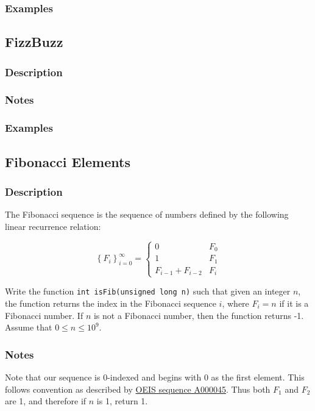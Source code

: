 \documentclass{article}
\begin{document}
\subsubsection{Examples}
\blindtext

\subsection{FizzBuzz}
\subsubsection{Description}
\blindtext

\subsubsection{Notes}
\blindtext

\subsubsection{Examples}
\blindtext

\subsection{Fibonacci Elements}
\subsubsection{Description}
The Fibonacci sequence is the sequence of numbers defined by the following linear recurrence relation:

\begin{equation}
  \left \{     F_i     \right \}_{i=0}^{\infty } = \begin{cases}
    0 & F_0\\
    1 & F_1 \\
    F_{i-1} + F_{i-2} & F_i
  \end{cases}
\end{equation}

Write the function \texttt{int isFib(unsigned long n)} such that given an integer $n$, the function returns the index in the Fibonacci sequence $i$, where $F_i = n$ if it is a Fibonacci number. 
If $n$ is not a Fibonacci number, then the function returns -1.
Assume that $ 0 \le n \le 10^9 $.

\subsubsection{Notes}
Note that our sequence is 0-indexed and begins with 0 as the first element. 
This follows convention as described by \href{https://oeis.org/A000045}{OEIS sequence A000045}.
Thus both $F_1$ and $F_2$ are 1, and therefore if $n$ is 1, return 1.
\end{document}
